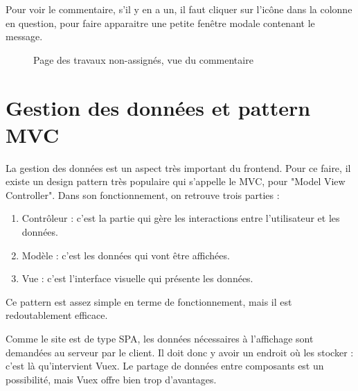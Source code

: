 \documentclass[
    iai, %
    eai, %
]{heig-tb}
\begin{document}
Pour voir le commentaire, s'il y en a un, il faut cliquer sur l'icône dans la colonne en question, pour faire apparaitre une petite fenêtre modale contenant le message.

\begin{figure}[h!]
  \caption{Page des travaux non-assignés, vue du commentaire}
\end{figure}

\section{Gestion des données et pattern MVC}
La gestion des données est un aspect très important du frontend.
Pour ce faire, il existe un design pattern très populaire qui s'appelle le MVC, pour "Model View Controller".
Dans son fonctionnement, on retrouve trois parties :
\begin{enumerate}
  \item Contrôleur : c'est la partie qui gère les interactions entre l'utilisateur et les données.
  \item Modèle : c'est les données qui vont être affichées.
  \item Vue : c'est l'interface visuelle qui présente les données.
\end{enumerate}
\bigskip

Ce pattern est assez simple en terme de fonctionnement, mais il est redoutablement efficace.


Comme le site est de type SPA, les données nécessaires à l'affichage sont demandées au serveur par le client.
Il doit donc y avoir un endroit où les stocker : c'est là qu'intervient Vuex.
Le partage de données entre composants est un possibilité, mais Vuex offre bien trop d'avantages.
\end{document}
